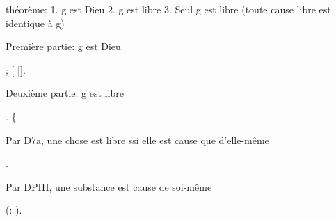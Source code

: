 \documentclass[10pt]{report}
\begin{document}
\begin{coqdoccode}
\begin{coqdoccomment}
théorème:\coqdoceol
\coqdocindent{2.50em}
1.\coqdocindent{0.50em}
g\coqdocindent{0.50em}
est\coqdocindent{0.50em}
Dieu\coqdoceol
\coqdocindent{2.50em}
2.\coqdocindent{0.50em}
g\coqdocindent{0.50em}
est\coqdocindent{0.50em}
libre\coqdoceol
\coqdocindent{2.50em}
3.\coqdocindent{0.50em}
Seul\coqdocindent{0.50em}
g\coqdocindent{0.50em}
est\coqdocindent{0.50em}
libre\coqdocindent{0.50em}
(toute\coqdocindent{0.50em}
cause\coqdocindent{0.50em}
libre\coqdocindent{0.50em}
est\coqdocindent{0.50em}
identique\coqdocindent{0.50em}
à\coqdocindent{0.50em}
g)\coqdocindent{0.50em}
\end{coqdoccomment}
\coqdoceol
\coqdocemptyline
\coqdocindent{1.00em}
\begin{coqdoccomment}
\coqdocindent{0.50em}
Première\coqdocindent{0.50em}
partie:\coqdocindent{0.50em}
g\coqdocindent{0.50em}
est\coqdocindent{0.50em}
Dieu\coqdocindent{0.50em}
\end{coqdoccomment}
\coqdoceol
\coqdocindent{1.00em}
; [ |].\coqdoceol
\coqdocemptyline
\coqdocindent{1.00em}
\begin{coqdoccomment}
\coqdocindent{0.50em}
Deuxième\coqdocindent{0.50em}
partie:\coqdocindent{0.50em}
g\coqdocindent{0.50em}
est\coqdocindent{0.50em}
libre\coqdocindent{0.50em}
\end{coqdoccomment}
\coqdoceol
\coqdocindent{1.00em}
.\coqdoceol
\coqdocindent{1.00em}
\{\coqdoceol
\coqdocindent{2.00em}
\begin{coqdoccomment}
\coqdocindent{0.50em}
Par\coqdocindent{0.50em}
D7a,\coqdocindent{0.50em}
une\coqdocindent{0.50em}
chose\coqdocindent{0.50em}
est\coqdocindent{0.50em}
libre\coqdocindent{0.50em}
ssi\coqdocindent{0.50em}
elle\coqdocindent{0.50em}
est\coqdocindent{0.50em}
cause\coqdocindent{0.50em}
que\coqdocindent{0.50em}
d'elle-même\coqdocindent{0.50em}
\end{coqdoccomment}
\coqdoceol
\coqdocindent{2.00em}
 .\coqdoceol
\coqdocemptyline
\coqdocindent{2.00em}
\begin{coqdoccomment}
\coqdocindent{0.50em}
Par\coqdocindent{0.50em}
DPIII,\coqdocindent{0.50em}
une\coqdocindent{0.50em}
substance\coqdocindent{0.50em}
est\coqdocindent{0.50em}
cause\coqdocindent{0.50em}
de\coqdocindent{0.50em}
soi-même\coqdocindent{0.50em}
\end{coqdoccomment}
\coqdoceol
\coqdocindent{2.00em}
 (:  ).\coqdoceol

\end{coqdoccode}
\end{document}

